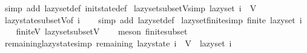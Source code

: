 \begin{isabellebody}
\endisadelimproof
%
\isatagproof
{}\isamarkupfalse%
\ {\isacharparenleft}{\kern0pt}simp\ add{\isacharcolon}{\kern0pt}\ lazy{\isacharunderscore}{\kern0pt}set{\isacharunderscore}{\kern0pt}def\ init{\isacharunderscore}{\kern0pt}state{\isacharunderscore}{\kern0pt}def{\isacharparenright}{\kern0pt}%
\endisatagproof
{\isafoldproof}%
%
\isadelimproof
\isanewline
%
\endisadelimproof
\isanewline
{}\isamarkupfalse%
\ lazy{\isacharunderscore}{\kern0pt}set{\isacharunderscore}{\kern0pt}subset{\isacharunderscore}{\kern0pt}V{\isacharbrackleft}{\kern0pt}simp{\isacharbrackright}{\kern0pt}{\isacharcolon}{\kern0pt}\ {\isachardoublequoteopen}lazy{\isacharunderscore}{\kern0pt}set\ i\ {\isasymsubseteq}\ V{\isachardoublequoteclose}\isanewline
%
\isadelimproof
\ \ %
\endisadelimproof
%
\isatagproof
{}\isamarkupfalse%
\ lazy{\isacharunderscore}{\kern0pt}state{\isacharunderscore}{\kern0pt}subset{\isacharunderscore}{\kern0pt}V{\isacharbrackleft}{\kern0pt}of\ i{\isacharbrackright}{\kern0pt}\isanewline
\ \ \isamarkupfalse%
\ {\isacharparenleft}{\kern0pt}simp\ add{\isacharcolon}{\kern0pt}\ lazy{\isacharunderscore}{\kern0pt}set{\isacharunderscore}{\kern0pt}def{\isacharparenright}{\kern0pt}%
\endisatagproof
{\isafoldproof}%
%
\isadelimproof
\isanewline
%
\endisadelimproof
\isanewline
{}\isamarkupfalse%
\ lazy{\isacharunderscore}{\kern0pt}set{\isacharunderscore}{\kern0pt}finite{\isacharbrackleft}{\kern0pt}simp{\isacharbrackright}{\kern0pt}{\isacharcolon}{\kern0pt}\ {\isachardoublequoteopen}finite\ {\isacharparenleft}{\kern0pt}lazy{\isacharunderscore}{\kern0pt}set\ i{\isacharparenright}{\kern0pt}{\isachardoublequoteclose}\isanewline
%
\isadelimproof
\ \ %
\endisadelimproof
%
\isatagproof
{}\isamarkupfalse%
\ finite{\isacharunderscore}{\kern0pt}V\ lazy{\isacharunderscore}{\kern0pt}set{\isacharunderscore}{\kern0pt}subset{\isacharunderscore}{\kern0pt}V\isanewline
\ \ \isamarkupfalse%
\ {\isacharparenleft}{\kern0pt}meson\ finite{\isacharunderscore}{\kern0pt}subset{\isacharparenright}{\kern0pt}%
\endisatagproof
{\isafoldproof}%
%
\isadelimproof
\isanewline
%
\endisadelimproof
\isanewline
{}\isamarkupfalse%
\ remaining{\isacharunderscore}{\kern0pt}lazy{\isacharunderscore}{\kern0pt}state{\isacharbrackleft}{\kern0pt}simp{\isacharbrackright}{\kern0pt}{\isacharcolon}{\kern0pt}\ {\isachardoublequoteopen}remaining\ {\isacharparenleft}{\kern0pt}lazy{\isacharunderscore}{\kern0pt}state\ i{\isacharparenright}{\kern0pt}\ {\isacharequal}{\kern0pt}\ V\ {\isacharminus}{\kern0pt}\ lazy{\isacharunderscore}{\kern0pt}set\ i{\isachardoublequoteclose}\isanewline

\end{isabellebody}

